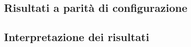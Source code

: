 \subsection{Risultati a parità di configurazione}\label{subsec:comp:result-comparison}


\subsection{Interpretazione dei risultati}\label{subsec:comp:result-evaluation}


